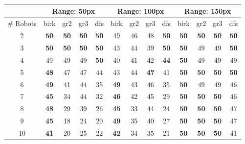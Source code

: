 \documentclass[letterpaper]{article}
\begin{document}
\begin{tabular}{|c|c|c|c|c|c|c|c|c|c|c|c|c|}
\hline
& \multicolumn{4}{|c|}{Range: 50px} & \multicolumn{4}{|c|}{Range: 100px} & \multicolumn{4}{|c|}{Range: 150px} \\ \hline
\# Robots & birk & gr2 & gr3 & dfs & birk & gr2 & gr3 & dfs & birk & gr2 & gr3 & dfs \\ \hline
2 & \textbf{50} & \textbf{50} & \textbf{50} & \textbf{50} & 49 & 46 & 48 & \textbf{50} & \textbf{50} & \textbf{50} & \textbf{50} & \textbf{50} \\ \hline
3 & \textbf{50} & \textbf{50} & \textbf{50} & \textbf{50} & 43 & 44 & 39 & \textbf{50} & \textbf{50} & 49 & 49 & \textbf{50} \\ \hline
4 & 49 & 49 & 49 & \textbf{50} & 40 & 41 & 42 & \textbf{44} & \textbf{50} & 49 & 49 & 49 \\ \hline
5 & \textbf{48} & 47 & 47 & 44 & 43 & 44 & \textbf{47} & 41 & \textbf{50} & \textbf{50} & \textbf{50} & \textbf{50} \\ \hline
6 & \textbf{49} & 41 & 44 & 35 & \textbf{49} & 43 & 46 & 35 & \textbf{50} & 49 & 49 & 46 \\ \hline
7 & \textbf{45} & 34 & 44 & 32 & \textbf{46} & 42 & 45 & 29 & \textbf{50} & \textbf{50} & \textbf{50} & 46 \\ \hline
8 & \textbf{48} & 29 & 39 & 26 & \textbf{45} & 33 & 44 & 24 & \textbf{50} & \textbf{50} & \textbf{50} & 47 \\ \hline
9 & \textbf{45} & 18 & 24 & 20 & \textbf{49} & 35 & 40 & 27 & \textbf{50} & \textbf{50} & \textbf{50} & 47 \\ \hline
10 & \textbf{41} & 20 & 25 & 22 & \textbf{42} & 34 & 35 & 21 & \textbf{50} & \textbf{50} & \textbf{50} & 41 \\ \hline
\end{tabular}
\end{document}
